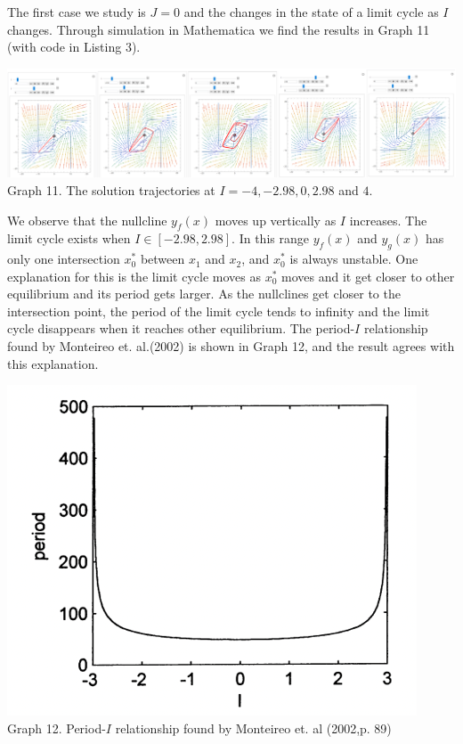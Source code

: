 \documentclass[12pt]{article}
\begin{document}
The first case we study is $J=0$ and the changes in the state of a limit cycle as $I$ changes. Through simulation in Mathematica we find the results in Graph 11 (with code in Listing 3). 

\begin{center}
  \includegraphics[scale=0.4]{ I-exp.png}\\
  \footnotesize{Graph 11. The solution trajectories at $I=-4,-2.98,0,2.98$ and $4$.}
  \end{center}

We observe that the nullcline $y_f(x)$ moves up vertically as $I$ increases. The limit cycle exists when $I\in [-2.98,2.98]$. In this range $y_f(x)$ and $y_g(x)$ has only one intersection $x_0^*$ between $x_1$ and $x_2$, and $x_0^*$ is always unstable. One explanation for this is the limit cycle moves as $x_0^*$ moves and it get closer to other equilibrium and its period gets larger. As the nullclines get closer to the intersection point, the period of the limit cycle tends to infinity and the limit cycle disappears when it reaches other equilibrium. The period-$I$ relationship found by Monteireo et. al.(2002) is shown in Graph 12, and the result agrees with this explanation.

\begin{center}
  \includegraphics[scale=0.7]{GeneralCase01_1.png}\\
  \footnotesize{Graph 12. Period-$I$ relationship found by Monteireo et. al (2002,p. 89)}
  \end{center}
\end{document}
